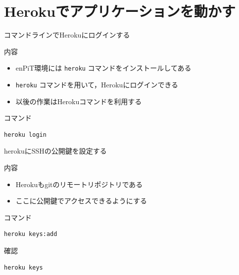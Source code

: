 \documentclass[t, aspectratio=169]{beamer}
\begin{document}
\section{Herokuでアプリケーションを動かす}
\label{sec-5-2}
\begin{frame}[fragile,label=sec-5-2-1]{コマンドラインでHerokuにログインする}
 \begin{block}{内容}
\begin{itemize}
\item enPiT環境には \texttt{heroku} コマンドをインストールしてある
\item \texttt{heroku} コマンドを用いて，Herokuにログインできる
\item 以後の作業はHerokuコマンドを利用する
\end{itemize}
\end{block}

\begin{block}{コマンド}
\begin{verbatim}
heroku login
\end{verbatim}
\end{block}
\end{frame}
\begin{frame}[fragile,label=sec-5-2-2]{herokuにSSHの公開鍵を設定する}
 \begin{block}{内容}
\begin{itemize}
\item Herokuもgitのリモートリポジトリである
\item ここに公開鍵でアクセスできるようにする
\end{itemize}
\end{block}

\begin{block}{コマンド}
\begin{verbatim}
heroku keys:add
\end{verbatim}
\end{block}

\begin{block}{確認}
\begin{verbatim}
heroku keys
\end{verbatim}
\end{block}
\end{frame}
\end{document}
